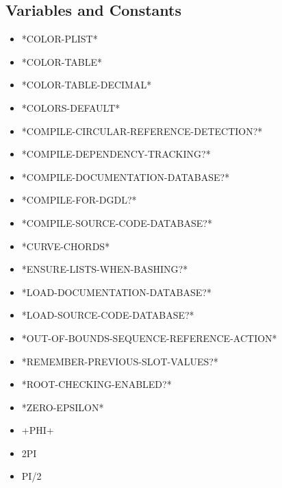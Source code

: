 \documentclass [11pt]{book}
\begin{document}
\subsection{Variables and Constants}

\label{subsec:variablesandconstants}



\begin{itemize}

\item {}*COLOR-PLIST*

\item {}*COLOR-TABLE*

\item {}*COLOR-TABLE-DECIMAL*

\item {}*COLORS-DEFAULT*

\item {}*COMPILE-CIRCULAR-REFERENCE-DETECTION?*

\item {}*COMPILE-DEPENDENCY-TRACKING?*

\item {}*COMPILE-DOCUMENTATION-DATABASE?*

\item {}*COMPILE-FOR-DGDL?*

\item {}*COMPILE-SOURCE-CODE-DATABASE?*

\item {}*CURVE-CHORDS*

\item {}*ENSURE-LISTS-WHEN-BASHING?*

\item {}*LOAD-DOCUMENTATION-DATABASE?*

\item {}*LOAD-SOURCE-CODE-DATABASE?*

\item {}*OUT-OF-BOUNDS-SEQUENCE-REFERENCE-ACTION*

\item {}*REMEMBER-PREVIOUS-SLOT-VALUES?*

\item {}*ROOT-CHECKING-ENABLED?*

\item {}*ZERO-EPSILON*

\item {}+PHI+

\item {}2PI

\item {}PI/2

\end{itemize}
\end{document}
